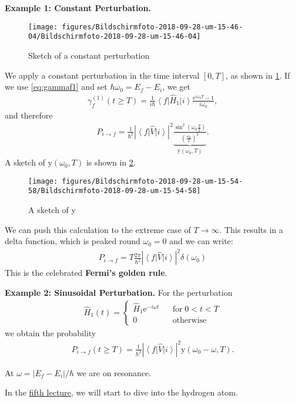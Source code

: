 \documentclass[10pt]{article}
\newcommand{\bra}[1]{\ensuremath{\left\langle#1\right|}}
\newcommand{\ket}[1]{\ensuremath{\left|#1\right\rangle}}
\newcommand{\eexp}[1]{\mathrm{e}^{#1}}
\begin{document}
\textbf{Example 1: Constant Perturbation.}
\begin{figure}[h!]
\begin{center}
\texttt{[image: figures/Bildschirmfoto-2018-09-28-um-15-46-04/Bildschirmfoto-2018-09-28-um-15-46-04]}
\caption{{Sketch of a constant perturbation
{\label{723552}}%
}}
\end{center}
\end{figure}

We apply a constant perturbation in the time interval $\left[0,T\right]$, as shown in
\ref{723552}. If we use \eqref{eq:gammaf1} and set $\hbar \omega_0 = E_f-E_i$, we get
\begin{align}
\gamma_f^{(1)}(t\geq T) = \frac{1}{i \hbar} \bra{f}\hat{H}_1\ket{i} \frac{\eexp{i\omega_0 T}-1}{i\omega_0},
\end{align}
and therefore
\begin{align}
P_{i\to f} = \frac{1}{\hbar^2}\left|\bra{f}\hat{V}\ket{i}\right|^2 \underbrace{\frac{\sin^2\left(\omega_0\frac{T}{2}\right)}{\left(\frac{\omega_0}{2}\right)^2}}_{\mathrm{y}(\omega_0,T)}.
\end{align}
A sketch of $\mathrm{y}(\omega_0,T)$ is shown in \ref{615128}.
\begin{figure}[h!]
\begin{center}
\texttt{[image: figures/Bildschirmfoto-2018-09-28-um-15-54-58/Bildschirmfoto-2018-09-28-um-15-54-58]}
\caption{{A sketch of y
{\label{615128}}%
}}
\end{center}
\end{figure}

We can push this calculation to the extreme case of $T\rightarrow \infty$. This results in a delta function, which is peaked round $\omega_0 = 0$ and we can write:
\begin{align}
P_{i\to f} =  T\frac{2\pi}{\hbar^2}\left|\bra{f}\hat{V}\ket{i}\right|^2\delta(\omega_0)
\end{align}
This is the celebrated \textbf{Fermi's golden rule}.

\textbf{Example 2: Sinusoidal Perturbation.}
For the perturbation
\begin{align}
\hat{H}_1(t) = \left\{ \begin{array}{ccl} \hat{H}_1\eexp{-i\omega t} && \text{for}\; 0 < t < T \\ 0 &&\text{otherwise}\end{array} \right.
\end{align}
we obtain the probability
\begin{align}
P_{i\to f} (t \geq T) = \frac{1}{\hbar^2} \left|\bra{f}\hat{V}\ket{i}\right|^2 \mathrm{y}(\omega_0 - \omega, T).
\end{align}

At $\omega = \left|E_f - E_i\right|/\hbar$ we are on resonance.

In the
\href{https://www.authorea.com/users/143341/articles/326514-lecture-5-the-hydrogen-atom}{fifth
lecture}, we will start to dive into the hydrogen atom.

\FloatBarrier
\nocite{*}



\end{document}

